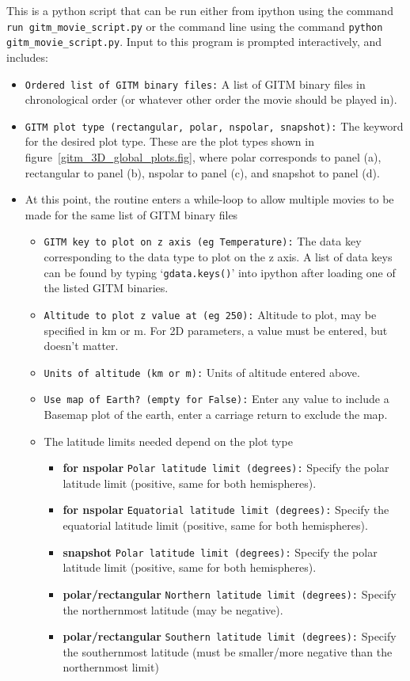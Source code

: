 This is a python script that can be run either from ipython using the command {\tt run gitm\_movie\_script.py} or the command line using the command {\tt python gitm\_movie\_script.py}.  Input to this program is prompted interactively, and includes:

\begin{itemize}
\item{{\tt Ordered list of GITM binary files:}  A list of GITM binary files in chronological order (or whatever other order the movie should be played in).}
\item{{\tt GITM plot type (rectangular, polar, nspolar, snapshot):}  The keyword for the desired plot type.  These are the plot types shown in figure~\ref{gitm_3D_global_plots.fig}, where polar corresponds to panel (a), rectangular to panel (b), nspolar to panel (c), and snapshot to panel (d).}
\item{At this point, the routine enters a while-loop to allow multiple movies to be made for the same list of GITM binary files}
	\begin{itemize}
	\item{{\tt GITM key to plot on z axis (eg Temperature):} The data key corresponding to the data type to plot on the z axis.  A list of data keys can be found by typing `{\tt gdata.keys()}' into ipython after loading one of the listed GITM binaries.}
	\item{{\tt Altitude to plot z value at (eg 250):} Altitude to plot, may be specified in km or m.  For 2D parameters, a value must be entered, but doesn't matter.}
	\item{{\tt Units of altitude (km or m):} Units of altitude entered above.}
	\item{{\tt Use map of Earth? (empty for False):} Enter any value to include a Basemap plot of the earth, enter a carriage return to exclude the map.}
	\item{The latitude limits needed depend on the plot type}
		\begin{itemize}
		\item{{\bf for nspolar}  {\tt Polar latitude limit (degrees):} Specify the polar latitude limit (positive, same for both hemispheres).}
		\item{{\bf for nspolar} {\tt Equatorial latitude limit (degrees):} Specify the equatorial latitude limit (positive, same for both hemispheres).}
		\item{{\bf snapshot} {\tt Polar latitude limit (degrees):} Specify the polar latitude limit (positive, same for both hemispheres).}
		\item{{\bf polar/rectangular} {\tt Northern latitude limit (degrees):} Specify the northernmost latitude (may be negative).}
     	   	\item{{\bf polar/rectangular} {\tt Southern latitude limit (degrees):} Specify the southernmost latitude (must be smaller/more negative than the northernmost limit)}
		\end{itemize}
		

\end{itemize}
\end{itemize}
